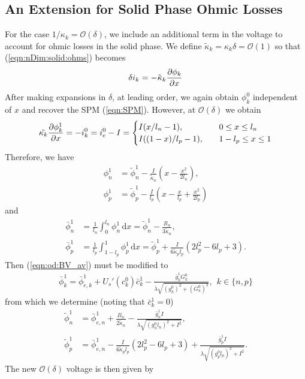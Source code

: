 \documentclass[preprint]{elsarticle}
\begin{document}
\subsection{An Extension for Solid Phase Ohmic Losses}
For the case $1/\kappa_k=\mathcal{O}(\delta)$, we include an additional term in the voltage to account for ohmic losses in the solid phase. We define $\tilde{\kappa}_k=\kappa_k \delta = \mathcal{O}(1)$ so that (\ref{eqn:nDim:solid:ohms}) becomes
\begin{equation} 
	\mathcal{\delta} i_k = -\tilde{\kappa}_k \pdv{\phi_k}{x} 
\end{equation} 
After making expansions in $\delta$, at leading order, we again obtain $\phi_k^0$ independent of $x$ and recover the SPM (\ref{eqn:SPM}). However, at $\mathcal{O}(\delta)$ we obtain 
\begin{equation} 
	\tilde{\kappa_k} \pdv{\phi_k^1}{x} = - i_k^0 = i_e^0-I =
    \begin{cases} 
    I(x/l_n - 1), \quad &0\leq x\leq l_n \\ 
    I((1-x)/l_p - 1), \quad &1-l_p \leq x \leq 1 
    \end{cases}
\end{equation} 
Therefore, we have 
\begin{align} 
	\phi_n^1 &= \tilde{\phi}_n^1 - \frac{I}{\tilde{\kappa}_n}\left(x - \frac{x^2}{2l_n}\right), \\ 
    \phi_p^1 &= \tilde{\phi}_p^1 - \frac{I}{l_p} \left( x - \frac{x}{l_p} + \frac{x^2}{2l_p} \right) 
\end{align} 
and 
\begin{align} 
\bar{\phi}_n^1 &= \frac{1}{l_n} \int_0^{l_n}\phi_n^1\, \text{d}x = \tilde{\phi}_n^1 - \frac{I l_n}{3 \tilde{\kappa}_n}, \\ 
\bar{\phi}_p^1 &= \frac{1}{l_p} \int_{1-l_p}^{1}\phi_p^1\, \text{d}x = \tilde{\phi}_p^1 + \frac{I}{6 \tilde{\kappa}_p l_p}\left(2l_p^2 - 6l_p + 3 \right).
\end{align}
Then (\ref{eqn:od:BV_av}) must be modified to 
\begin{gather}
	\bar{\phi}_k^1 = \bar{\phi}_{e,k}^1 + U_s'(c_k^0)\bar{c}_k^1 - \frac{\bar{g}_k^1G_k^0}{\lambda\sqrt{(g_k^0)^2 + (G_k^0)^2}}, \ \ k\in\{n,p\}
\end{gather} 
from which we determine (noting that $\bar{c}^1_k=0$)
\begin{align} 
	\tilde{\phi}_n^1 &= \bar{\phi}_{e,n}^1 +\frac{Il_n}{2\tilde{\kappa}_n} - \frac{\bar{g}_n^1I}{\lambda\sqrt{(g_n^0l_n)^2 + I^2}}, \\
    \tilde{\phi}_p^1 &= \bar{\phi}_{e,n}^1 - \frac{I}{6 \tilde{\kappa}_p l_p}\left(2l_p^2 - 6l_p + 3 \right) + \frac{\bar{g}_p^1I}{\lambda\sqrt{(g_p^0l_p)^2 + I^2}}.
\end{align} 
The new $\mathcal{O}(\delta)$ voltage is then given by
\end{document}
